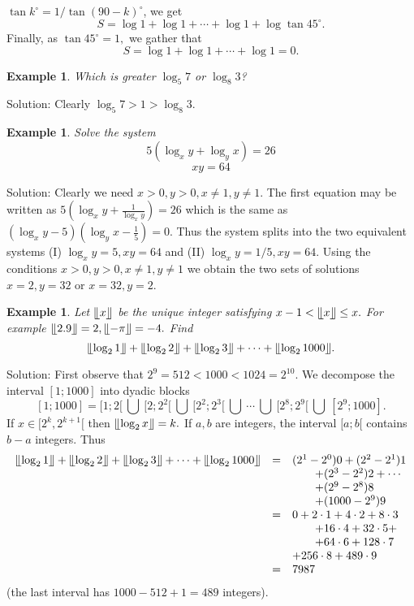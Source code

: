 \documentclass[11pt, openany]{book}
\theoremstyle{change} \theoremheaderfont{\blue\sffamily\bfseries}
\newtheorem{exa}[thm]{Example}
\theoremstyle{nonumberplain} \theoremheaderfont{\sffamily\bfseries}
\newcommand{\dis}{\displaystyle}
\newcommand{\í}{\'{\i}}
\begin{document}
$\tan k^\circ = 1/ \tan (90 - k)^\circ$, we get
$$S = \log 1 + \log 1 + \cdots + \log 1 + \log \tan 45^\circ .$$ Finally, as
$\tan 45^\circ = 1,$ we gather that
$$S = \log 1 + \log 1 + \cdots + \log 1 = 0.$$
\begin{exa} Which is greater $\log _5 7$ or $\log _{8} 3$?\end{exa}
Solution: Clearly $\log _5 7 > 1 > \log _8 3$.
\begin{exa}
Solve the system
$$5\left(\log _x y + \log _y x\right) = 26$$
$$xy = 64$$
\end{exa}
Solution: Clearly we need $x > 0, y > 0, x \neq 1, y \neq 1.$ The
first equation may be written as $\dis{5\left(\log _x y +
\frac{1}{\log _x y}\right) = 26}$ which is the same as $(\log _x y
- 5)(\log _y x - \frac{1}{5}) = 0$. Thus the system splits into
the two equivalent systems (I) $\log _x y = 5, xy = 64$ and (II)
$\log _x y = 1/5, xy = 64.$ Using the conditions $x > 0, y > 0, x
\neq 1, y \neq 1$ we obtain the two sets of solutions $x = 2, y =
32$ or $x = 32, y = 2.$

\begin{exa} Let $\llfloor x \rrfloor$ be the unique integer satisfying
$x - 1 < \llfloor x \rrfloor \leq x.$ For example $\llfloor 2.9
\rrfloor = 2, \llfloor -\pi \rrfloor = -4.$ Find
$$\llfloor \log _2 1 \rrfloor + \llfloor \log _2 2 \rrfloor + \llfloor \log _2 3 \rrfloor
+ \cdots + \llfloor \log _2 1000 \rrfloor . $$
\end{exa} Solution: First observe that $2^9 = 512 < 1000 < 1024 = 2^{10}.$
We decompose the interval $[1; 1000]$ into dyadic blocks
$$[1; 1000] = [1; 2[ \ \bigcup \ [2; 2^2[ \ \bigcup \ [2^2; 2^3[ \ \bigcup \  \cdots
\ \bigcup \ [2^8; 2^9[ \ \bigcup\ [2^9; 1000]. $$ If $x \in [2^k,
2^{k + 1}[$ then  $\llfloor \log _2 x \rrfloor = k.$ If $a, b$ are
integers, the interval $[a; b[$ contains $b - a$ integers. Thus
$$\begin{array}{lll}
\llfloor \log _2 1 \rrfloor + \llfloor \log _2 2 \rrfloor + \llfloor
\log _2 3 \rrfloor + \cdots + \llfloor \log _2 1000 \rrfloor  & = &
(2^1 - 2^0)0 +
(2^2 - 2^1)1\\ & & \qquad + (2^3 - 2^2)2 + \cdots \\
& & \qquad + (2^9 - 2^8)8\\ & & \qquad + (1000 - 2^9)9 \\
& = & 0 + 2\cdot 1 +  4\cdot 2 + 8\cdot 3\\ & & \qquad + 16\cdot 4 + 32\cdot 5 + \\
& & \qquad + 64\cdot 6 + 128\cdot 7 \\ \qquad & & + 256\cdot 8 + 489\cdot 9 \\
& = & 7987  \\
\end{array}
$$
(the last interval has $1000 - 512 + 1 = 489$ integers).
\end{document}
